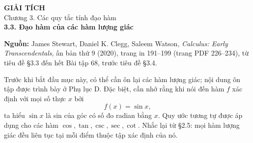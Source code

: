 \documentclass[12pt,a4paper]{article}
\begin{document}
\begin{center}
{\Large\bfseries GIẢI TÍCH}\\[5pt]
{\large Chương 3. Các quy tắc tính đạo hàm}\\[9pt]
{\Large\bfseries 3.3. Đạo hàm của các hàm lượng giác}
\end{center}
\noindent\textbf{Nguồn:} James Stewart, Daniel K. Clegg, Saleem Watson, \textit{Calculus: Early Transcendentals}, ấn bản thứ 9 (2020), trang in 191–199 (trang PDF 226–234), từ tiêu đề §3.3 đến hết Bài tập 68, trước tiêu đề §3.4.

Trước khi bắt đầu mục này, có thể cần ôn lại các hàm lượng giác; nội dung ôn tập được trình bày ở Phụ lục D. Đặc biệt, cần nhớ rằng khi nói đến hàm $f$ xác định với mọi số thực $x$ bởi
\[f(x)=\sin x,\]
ta hiểu $\sin x$ là sin của góc có số đo radian bằng $x$. Quy ước tương tự được áp dụng cho các hàm $\cos,\tan,\csc,\sec,\cot$. Nhắc lại từ §2.5: mọi hàm lượng giác đều liên tục tại mỗi điểm thuộc tập xác định của nó.
\end{document}
